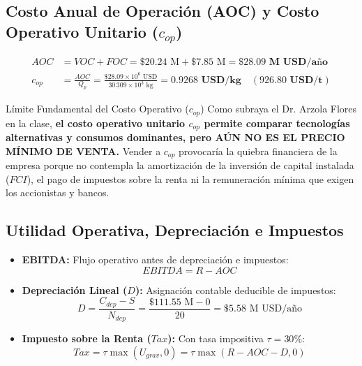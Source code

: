\documentclass[11pt,letterpaper]{article}
\begin{document}
\subsection{Costo Anual de Operación (AOC) y Costo Operativo Unitario ($c_{op}$)}
\begin{align}
    AOC &= VOC + FOC = \$20.24\text{ M} + \$7.85\text{ M} = \mathbf{\$28.09\text{ M USD/año}} \\
    c_{op} &= \frac{AOC}{Q_p} = \frac{\$28.09 \times 10^6\text{ USD}}{30\,309 \times 10^3\text{ kg}} = \mathbf{0.9268\text{ USD/kg}} \quad (\mathbf{926.80\text{ USD/t}})
\end{align}

\begin{warningbox}{Límite Fundamental del Costo Operativo ($c_{op}$)}
Como subraya el Dr. Arzola Flores en la clase, \textbf{el costo operativo unitario $c_{op}$ permite comparar tecnologías alternativas y consumos dominantes, pero AÚN NO ES EL PRECIO MÍNIMO DE VENTA.} Vender a $c_{op}$ provocaría la quiebra financiera de la empresa porque no contempla la amortización de la inversión de capital instalada ($FCI$), el pago de impuestos sobre la renta ni la remuneración mínima que exigen los accionistas y bancos.
\end{warningbox}

\subsection{Utilidad Operativa, Depreciación e Impuestos}
\begin{itemize}[leftmargin=*]
    \item \textbf{EBITDA:} Flujo operativo antes de depreciación e impuestos:
    \begin{equation}
        EBITDA = R - AOC
    \end{equation}
    \item \textbf{Depreciación Lineal ($D$):} Asignación contable deducible de impuestos:
    \begin{equation}
        D = \frac{C_{dep} - S}{N_{dep}} = \frac{\$111.55\text{ M} - 0}{20} = \$5.58\text{ M USD/año}
    \end{equation}
    \item \textbf{Impuesto sobre la Renta ($Tax$):} Con tasa impositiva $\tau = 30\%$:
    \begin{equation}
        Tax = \tau \max(U_{grav}, 0) = \tau \max(R - AOC - D, 0)
    \end{equation}
\end{itemize}
\end{document}
